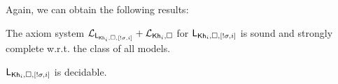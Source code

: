 Again, we can obtain the following results: 

\begin{corollary}
The axiom system $\mathcal{L}_{\mathsf{L}_{{\sf Kh}_i,\square,[!\sigma,i]}}+\mathcal{L}_{{\sf Kh}_i,\square}$ for $\mathsf{L}_{{\sf Kh}_i,\square,[!\sigma,i]}$ is sound and strongly complete w.r.t. the class of all models.
\end{corollary}

\begin{corollary}
$\mathsf{L}_{{\sf Kh}_i,\square,[!\sigma,i]}$ is decidable.
\end{corollary}
 
 
 
